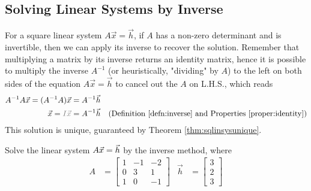 \subsection{Solving Linear Systems by Inverse}
\label{subsection:SolLinSysInv}
For a square linear system $A\vec{x} = \vec{h}$, if $A$ has a non-zero determinant and is invertible, then we can apply its inverse to recover the solution. Remember that multiplying a matrix by its inverse returns an identity matrix, hence it is possible to multiply the inverse $A^{-1}$ (or heuristically, "dividing" by $A$) to the left on both sides of the equation $A\vec{x} = \vec{h}$ to cancel out the $A$ on L.H.S., which reads
\begin{align}
A^{-1}A\vec{x}= (A^{-1}A)\vec{x} &= A^{-1}\vec{h} \nonumber \\
\vec{x} = \textcolor{gray}{I\vec{x}} &= A^{-1}\vec{h} &\text{(Definition \ref{defn:inverse} and Properties \ref{proper:identity})} \label{eqn:inversesol}
\end{align}
This solution is unique, guaranteed by Theorem \ref{thm:sqlinsysunique}.
\begin{exmp}
Solve the linear system $A\vec{x} = \smash{\vec{h}}$ by the inverse method, where
\begin{align*}
A &=
\begin{bmatrix}
1 & -1 & -2 \\
0 & 3 & 1 \\
1 & 0 & -1
\end{bmatrix}
& \vec{h} &=
\begin{bmatrix}
3 \\
2 \\
3
\end{bmatrix}
\end{align*}
\end{exmp}
